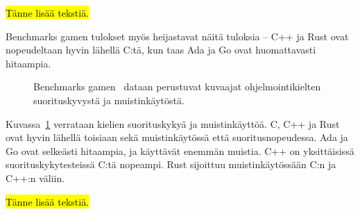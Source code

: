 \hl{Tänne lisää tekstiä.}

\FloatBarrier

\newpage

Benchmarks gamen tulokset myös heijastavat näitä tuloksia -- C++ ja Rust ovat
nopeudeltaan hyvin lähellä C:tä, kun taas Ada ja Go ovat huomattavasti
hitaampia.

\FloatBarrier

\begin{figure}[ht!]
    \begin{adjustbox}{center}
    \begin{minipage}{1.1\textwidth}
    \begin{minipage}{0.5\textwidth}
        
    \end{minipage}
    \begin{minipage}{0.5\textwidth}
        
    \end{minipage}
    \end{minipage}
    \end{adjustbox}
    \caption{
        Benchmarks gamen~\citep[data haettu 29.11.2018]{benchmarks} dataan
        perustuvat kuvaajat ohjelmointikielten suorituskyvystä ja
        muistinkäytöstä.
    }
    \label{fig:benchmarksgame}
\end{figure}

\FloatBarrier

Kuvassa~\ref{fig:benchmarksgame} verrataan kielien suorituskykyä ja
muistinkäyttöä. C, C++ ja Rust ovat hyvin lähellä toisiaan sekä muistinkäytössä
että suoritusnopeudessa. Ada ja Go ovat selkeästi hitaampia, ja käyttävät
enemmän muistia. C++ on yksittäisissä suorituskykytesteissä C:tä nopeampi. Rust
sijoittuu muistinkäytössään C:n ja C++:n väliin.

\hl{Tänne lisää tekstiä.}
